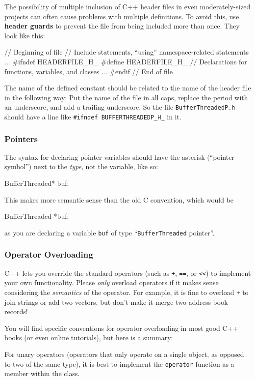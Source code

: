 \documentclass[12pt]{article}
\newcommand{\code}[1]{\texttt{#1}}
\newcommand{\textdef}[1]{\textbf{#1}}
\begin{document}
The possibility of multiple inclusion of C++ header files in even moderately-sized projects can often cause problems with multiple definitions. To avoid this, use \textdef{header guards} to prevent the file from being included more than once. They look like this:
\begin{codeex}
// Beginning of file
// Include statements, ``using'' namespace-related statements
...
#ifndef HEADERFILE_H_
#define HEADERFILE_H_
// Declarations for functions, variables, and classes
...
#endif
// End of file
\end{codeex}
The name of the defined constant should be related to the name of the header file in the following way: Put the name of the file in all caps, replace the period with an underscore, and add a trailing underscore. So the file \code{BufferThreadedP.h} should have a line like \code{\#ifndef BUFFERTHREADEDP\_H\_} in it.

\subsubsection{Pointers}
The syntax for declaring pointer variables should have the asterisk (``pointer symbol'') next to the \emph{type}, not the variable, like so:
\begin{codeex}
BufferThreaded* buf;
\end{codeex}
This makes more semantic sense than the old C convention, which would be
\begin{codeex}
BufferThreaded *buf;
\end{codeex}
as you are declaring a variable \texttt{buf} of type ``\texttt{BufferThreaded} pointer''.

\subsubsection{Operator Overloading}
C++ lets you override the standard operators (such as \texttt{+}, \texttt{==}, or \texttt{<{}<}) to implement your own functionality. Please \emph{only} overload operators if it makes sense considering the \emph{semantics} of the operator. For example, it is fine to overload \texttt{+} to join strings or add two vectors, but don't make it merge two address book records!

You will find specific conventions for operator overloading in most good C++ books (or even online tutorials), but here is a summary:

For unary operators (operators that only operate on a single object, as opposed to two of the same type), it is best to implement the \texttt{operator} function as a member within the class.
\end{document}
